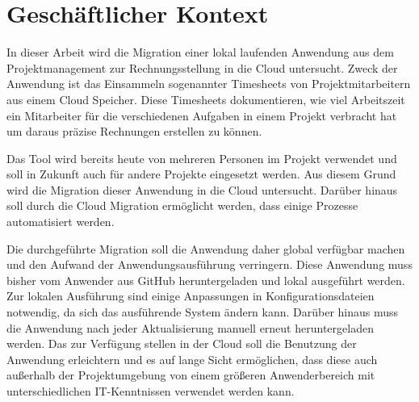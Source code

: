 \section{Geschäftlicher Kontext}

In dieser Arbeit wird die Migration einer lokal laufenden Anwendung aus dem Projektmanagement zur Rechnungsstellung in die Cloud untersucht. Zweck der Anwendung ist das Einsammeln sogenannter Timesheets von Projektmitarbeitern aus einem Cloud Speicher. Diese Timesheets dokumentieren, wie viel Arbeitszeit ein Mitarbeiter für die verschiedenen Aufgaben in einem Projekt verbracht hat um daraus präzise Rechnungen erstellen zu können.

Das Tool wird bereits heute von mehreren Personen im Projekt verwendet und soll in Zukunft auch für andere Projekte eingesetzt werden. Aus diesem Grund wird die Migration dieser Anwendung in die Cloud untersucht.
Darüber hinaus soll durch die Cloud Migration ermöglicht werden, dass einige Prozesse automatisiert werden.


Die durchgeführte Migration soll die Anwendung daher global verfügbar machen und den Aufwand der Anwendungsausführung verringern. Diese Anwendung muss bisher vom Anwender aus GitHub heruntergeladen und lokal ausgeführt werden. Zur lokalen Ausführung sind einige Anpassungen in Konfigurationsdateien notwendig, da sich das ausführende System ändern kann. Darüber hinaus muss die Anwendung nach jeder Aktualisierung manuell erneut heruntergeladen werden. Das zur Verfügung stellen in der Cloud soll die Benutzung der Anwendung erleichtern und es auf lange Sicht ermöglichen, dass diese auch außerhalb der Projektumgebung von einem größeren Anwenderbereich mit unterschiedlichen IT-Kenntnissen verwendet werden kann.